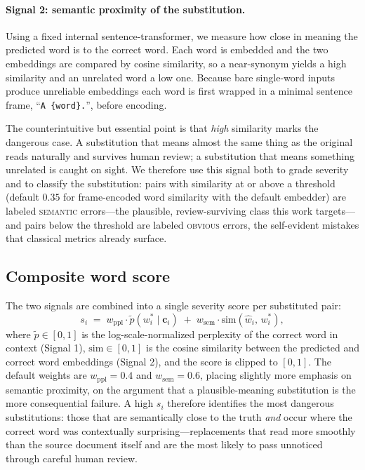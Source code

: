 \documentclass{anthology-ch}         %
\begin{document}
\paragraph{Signal 2: semantic proximity of the substitution.}
Using a fixed internal sentence-transformer, we measure how close in meaning the
predicted word is to the correct word. Each word is embedded and the two
embeddings are compared by cosine similarity, so a near-synonym yields a high
similarity and an unrelated word a low one. Because bare single-word inputs
produce unreliable embeddings each word is first
wrapped in a minimal sentence frame, ``\texttt{A \{word\}.}'', before encoding.

The counterintuitive but essential point is that \emph{high} similarity marks
the dangerous case. A substitution that means almost the same thing as the
original reads naturally and survives human review; a substitution that means
something unrelated is caught on sight. We therefore use this signal both to
grade severity and to classify the substitution: pairs with similarity at or
above a threshold (default $0.35$ for frame-encoded word similarity with the
default embedder) are labeled \textsc{semantic} errors---the plausible,
review-surviving class this work targets---and pairs below the threshold are
labeled \textsc{obvious} errors, the self-evident mistakes that classical
metrics already surface.


\subsection{Composite word score}

The two signals are combined into a single severity score per substituted pair:
%
\begin{equation}
    s_i \;=\; w_{\mathrm{ppl}}\cdot \tilde{p}(w^{*}_i \mid \mathbf{c}_i)
            \;+\; w_{\mathrm{sem}}\cdot \mathrm{sim}(\hat{w}_i,\, w^{*}_i),
    \label{eq:composite}
\end{equation}
%
where $\tilde{p}\in[0,1]$ is the log-scale-normalized perplexity of the correct
word in context (Signal 1), $\mathrm{sim}\in[0,1]$ is the cosine similarity
between the predicted and correct word embeddings (Signal 2), and the score is
clipped to $[0,1]$. The default weights are $w_{\mathrm{ppl}}=0.4$ and
$w_{\mathrm{sem}}=0.6$, placing slightly more emphasis on semantic proximity, on
the argument that a plausible-meaning substitution is the more consequential
failure. A high $s_i$ therefore identifies the most dangerous substitutions:
those that are semantically close to the truth \emph{and} occur where the
correct word was contextually surprising---replacements that read more smoothly
than the source document itself and are the most likely to pass unnoticed
through careful human review.
\end{document}

